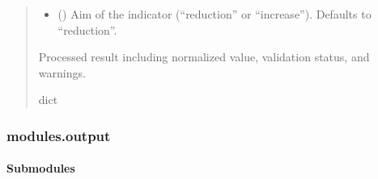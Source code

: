 \documentclass[letterpaper,10pt,english]{sphinxmanual}
\begin{document}
\begin{fulllineitems}
\begin{quote}
\begin{description}
\begin{itemize}
\item {} 
\sphinxAtStartPar
{} (\sphinxstyleliteralemphasis{\sphinxupquote{, }}) \textendash{} Aim of the indicator (“reduction” or “increase”). Defaults to “reduction”.

\end{itemize}

\sphinxAtStartPar
Processed result including normalized value, validation status, and warnings.

\sphinxAtStartPar
dict

\end{description}\end{quote}

\end{fulllineitems}


\sphinxstepscope


\subsubsection{modules.output}
\label{\detokenize{autoapi/modules/output/index:module-modules.output}}\label{\detokenize{autoapi/modules/output/index:modules-output}}\label{\detokenize{autoapi/modules/output/index::doc}}

\paragraph{Submodules}
\label{\detokenize{autoapi/modules/output/index:submodules}}
\sphinxstepscope
\end{document}
